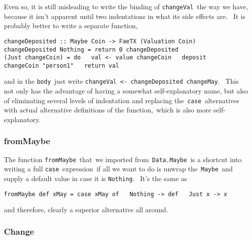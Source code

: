 \documentclass[11pt]{article}
\newcommand{\codeblock}[1]{\begin{mdframed}[
    backgroundcolor=header-color,
    linecolor=header-color,
    innertopmargin=10pt,
    ]{\texttt{#1}}\end{mdframed}}
\begin{document}

\vspace{11pt}

Even so, it is still misleading to write the binding of \texttt{changeVal} the way we have, because it isn't apparent until two indentations in what its side effects are.  It is probably better to write a separate function,

\codeblock{changeDeposited :: Maybe Coin -\textgreater{} FaeTX (Valuation Coin)\newline
changeDeposited Nothing = return 0\newline
changeDeposited (Just changeCoin) = do\newline
  val \textless{}- value changeCoin\newline
  deposit changeCoin "person1"\newline
  return val}

and in the \texttt{body} just write \texttt{changeVal }\texttt{\textless{}}\texttt{- changeDeposited changeMay}.  This not only has the advantage of having a somewhat self-explanatory name, but also of eliminating several levels of indentation and replacing the \texttt{case} alternatives with actual alternative definitions of the function, which is also more self-explanatory.

\subsubsection{fromMaybe}
\vspace{5.5pt}

The function \texttt{fromMaybe} that we imported from \texttt{Data.Maybe} is a shortcut into writing a full \texttt{case} expression if all we want to do is unwrap the \texttt{Maybe} and supply a default value in case it is \texttt{Nothing}.  It's the same as

\codeblock{fromMaybe def xMay = case xMay of\newline
  Nothing -\textgreater{} def\newline
  Just x -\textgreater{} x}

and therefore, clearly a superior alternative all around.

\subsubsection{Change}
\vspace{5.5pt}
\end{document}
